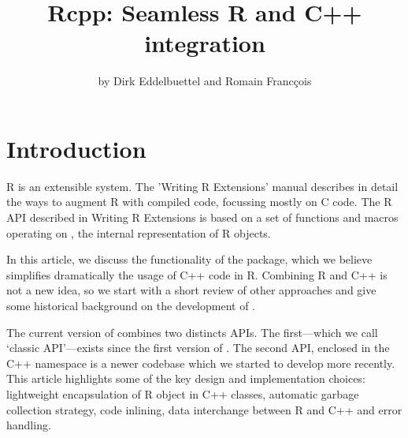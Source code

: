 
\title{Rcpp: Seamless R and C++ integration}
\author{by Dirk Eddelbuettel and Romain Franc\c{c}ois}

\maketitle


\section{Introduction} 

R is an extensible system. The 'Writing R Extensions' manual \citep{R:exts}
describes in detail the ways to augment R with compiled code,
focussing mostly on C code. The R API described in Writing R Extensions is
based on a set of functions and macros operating on , the internal
representation of R objects.

In this article, we discuss the functionality of the 
package, which we believe simplifies dramatically the usage of C++ code
in R. Combining R and C++ is not a new idea, so we start with
a short review of other approaches and give some historical
background on the development of .

The current version of  combines two distincts
APIs. The first---which we call `classic  API'---exists since 
the first version of . The second API, enclosed in the 
 C++ namespace is a newer codebase which we started to develop
more recently. This article 
highlights some of the key design and implementation choices: 
lightweight encapsulation of R object in C++ classes, automatic
garbage collection strategy, code inlining, data interchange between 
R and C++ and error handling. 

